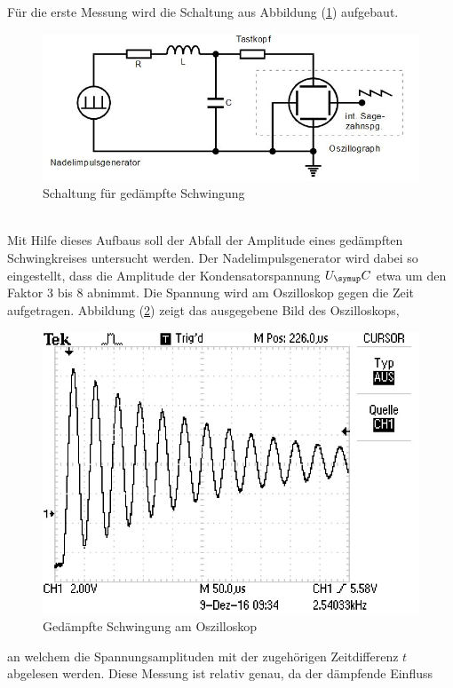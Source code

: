 Für die erste Messung wird die Schaltung aus Abbildung (\ref{fig:schlt1})
aufgebaut.
\begin{figure}[h]
  \centering
  \includegraphics[width=\textwidth]{Bilder/dmpfschalt.JPG}
  \caption{Schaltung für gedämpfte Schwingung\cite{354}}
  \label{fig:schlt1}
\end{figure} \\
Mit Hilfe dieses Aufbaus soll der Abfall der Amplitude eines gedämpften
Schwingkreises untersucht werden. Der Nadelimpulsgenerator wird dabei so
eingestellt, dass die Amplitude der Kondensatorspannung $U_\su{C}$ etwa um
den Faktor 3 bis 8 abnimmt. Die Spannung wird am Oszilloskop gegen die Zeit
aufgetragen.
Abbildung (\ref{fig:dämpfung}) zeigt das ausgegebene Bild des Oszilloskops,
\begin{figure} %
  \centering
  \includegraphics{Bilder/Dmpfung.JPG}
  \caption{Gedämpfte Schwingung am Oszilloskop}
  \label{fig:dämpfung}
\end{figure}
an welchem die Spannungsamplituden mit der zugehörigen Zeitdifferenz $t$
abgelesen werden. Diese Messung ist relativ genau, da der dämpfende Einfluss
